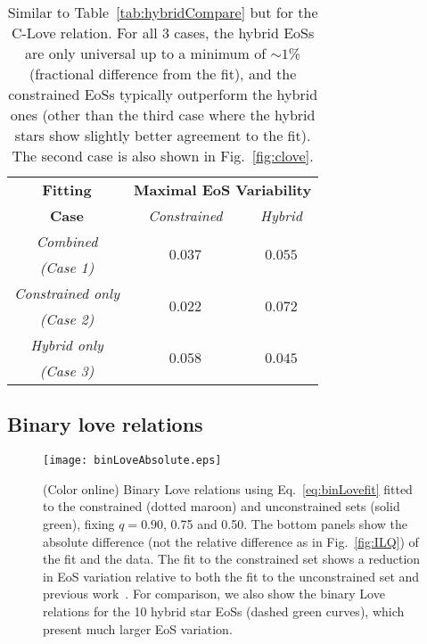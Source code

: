 \documentclass[prd,twocolumn,nofootinbib,superscriptaddress,amsmath,amssymb]{revtex4-1}
\begin{document}
\begin{table}
\centering
\begin{tabular}{ c  || c c } 
 \hline
 \hline
 \textbf{Fitting} & \multicolumn{2}{c}{\textbf{Maximal EoS Variability}} \\
 \cline{2-3}
 \textbf{Case} &  \multicolumn{1}{c|}{\emph{Constrained}} & \emph{Hybrid}\\
 \hline
 \emph{Combined} &  \multirow{2}{*}{$0.037$} & \multirow{2}{*}{$0.055$}\\
 \emph{(Case 1)} & &\\
 \cline{1-1}
 \emph{Constrained only} & \multirow{2}{*}{$0.022$} & \multirow{2}{*}{$0.072$}\\
  \emph{(Case 2)} & &\\
  \cline{1-1}
 \emph{Hybrid only} & \multirow{2}{*}{$0.058$} & \multirow{2}{*}{$0.045$}\\
  \emph{(Case 3)} & &\\
  \cline{1-1}
\hline
\hline
\end{tabular}
\caption{
Similar to Table~\ref{tab:hybridCompare} but for the C-Love relation.
For all 3 cases, the hybrid EoSs are only universal up to a minimum of $\sim1$\% (fractional difference from the fit), and the constrained EoSs typically outperform the hybrid ones (other than the third case where the hybrid stars show slightly better agreement to the fit). The second case is also shown in Fig.~\ref{fig:clove}.
}\label{tab:hybridCompareClove}
\end{table}


\subsection{Binary love relations}
\label{sec:binary}

\begin{figure}[htb]
\begin{center} 
\texttt{[image: binLoveAbsolute.eps]}
\end{center}
\caption{(Color online) Binary Love relations using Eq.~\eqref{eq:binLovefit} fitted to the constrained (dotted maroon) and unconstrained sets (solid green), fixing $q=0.90$, 0.75 and 0.50. The bottom panels show the absolute difference (not the relative difference as in Fig.~\ref{fig:ILQ}) of the fit and the data. The fit to the constrained set shows a reduction in EoS variation relative to both the fit to the unconstrained set and previous work~\cite{Yagi:binLove}. For comparison, we also show the binary Love relations for the 10 hybrid star EoSs (dashed green curves), which present much larger EoS variation. 
}
\label{fig:binLove}
\end{figure} 
\end{document}
